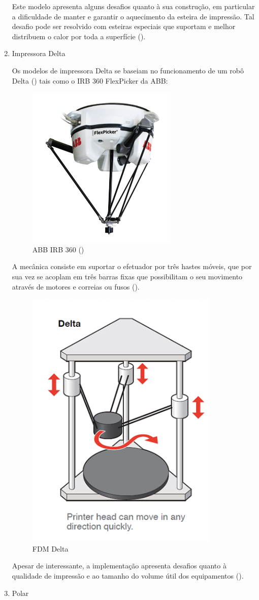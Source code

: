 \documentclass[12pt, english]{article}
\begin{document}
\begin{enumerate}[leftmargin=*, listparindent=0.7cm]
{		Este modelo apresenta alguns desafios quanto à sua construção, em particular a dificuldade de manter e garantir o aquecimento da esteira de impressão. Tal desafio pode ser resolvido com esteiras especiais que suportam e melhor distribuem o calor por toda a superfície (\cite{ALL3DP:Belt3DPrinter}).  

	}
	\item {
		
		Impressora Delta
			
		Os modelos de impressora Delta se baseiam no funcionamento de um robô Delta (\cite{Florin2016}) tais como o IRB 360 FlexPicker da ABB:

		\begin{figure}[H]
			\centering
			\includegraphics[height=.4\linewidth]{ABB-IRB360.png}
			\caption{ABB IRB 360 (\cite{ABB:IRB360})}
		\end{figure} 
		
		A mecânica consiste em suportar o efetuador por três hastes móveis, que por sua vez se acoplam em três barras fixas que possibilitam o seu movimento através de motores e correias ou fusos (\cite{Aasvik2017}).

		\begin{figure}[H]
			\centering
			\includegraphics[height=.4\linewidth]{FDM-Delta.png}
			\caption{FDM Delta}
		\end{figure} 

		Apesar de interessante, a implementação apresenta desafios quanto à qualidade de impressão e ao tamanho do volume útil dos equipamentos (\cite{3DPRINTERLY}). 
	}
	\item {
		Polar
	
}
\end{enumerate}
\end{document}
